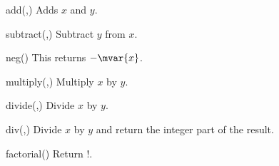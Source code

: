 \begin{math-function}{add(,)}
\mathcommand
    Adds $x$ and $y$.
\begin{codeexample}[]
 \pgfmathresult
\end{codeexample}
\end{math-function}

\begin{math-function}{subtract(,)}
\mathcommand
    Subtract $y$ from $x$.
\begin{codeexample}[]
 \pgfmathresult
\end{codeexample}
\end{math-function}

\begin{math-function}{neg()}
\mathcommand
    This returns $-\mvar{x}$.
\begin{codeexample}[]
 \pgfmathresult
\end{codeexample}
\end{math-function}

\begin{math-function}{multiply(,)}
\mathcommand
    Multiply $x$ by $y$.
\begin{codeexample}[]
 \pgfmathresult
\end{codeexample}
\end{math-function}

\begin{math-function}{divide(,)}
\mathcommand
    Divide $x$ by $y$.
\begin{codeexample}[]
 \pgfmathresult
\end{codeexample}
\end{math-function}

\begin{math-function}{div(,)}
\mathcommand
    Divide $x$ by $y$ and return the integer part of the result.
\begin{codeexample}[]
 \pgfmathresult
\end{codeexample}
\end{math-function}

\begin{math-function}{factorial()}
\mathcommand
    Return !.
\begin{codeexample}[]
 \pgfmathresult
\end{codeexample}
\end{math-function}

